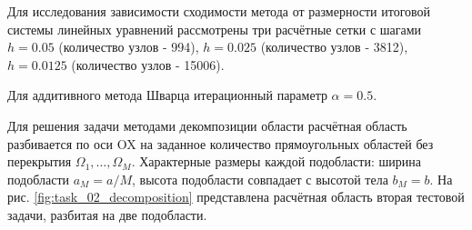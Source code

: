 \documentclass[a4paper]{article}
\begin{document}
Для исследования зависимости сходимости метода от размерности итоговой системы линейных уравнений рассмотрены три расчётные сетки с шагами $h = 0.05$ (количество узлов - 994), $h = 0.025$ (количество узлов - 3812), $h = 0.0125$ (количество узлов - 15006).

Для аддитивного метода Шварца итерационный параметр $\alpha = 0.5$.

\newpage

Для решения задачи методами декомпозиции области расчётная область разбивается по оси OX на заданное количество прямоугольных областей без перекрытия $\Omega_1, \ldots, \Omega_M$. Характерные размеры каждой подобласти: ширина подобласти $a_M = a / M$, высота подобласти совпадает с высотой тела $b_M = b$. На рис. \ref{fig:task_02_decomposition} представлена расчётная область вторая тестовой задачи, разбитая на две подобласти.
\end{document}
